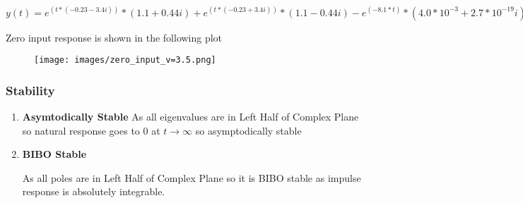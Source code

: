 \documentclass[notitlepage]{article}
\begin{document}



$y(t)=e^{(t*(- 0.23 - 3.4i))}*(1.1 + 0.44i) + e^{(t*(- 0.23 + 3.4i))}*(1.1 - 0.44i) - e^{(-8.1*t)}*(4.0*10^{-3} + 2.7*10^{-19}i) - e^{(-0.4*t)}*(1.3 - 1.6*10^{-16}i) - (5.3 + 4.7*10{-17}i)
$

\vspace{3mm}


Zero input response is shown in the following plot
\begin{figure}[!h]
    \centering
    \texttt{[image: images/zero\_input\_v=3.5.png]}
    \label{fig:my_label}
\end{figure}

\newpage
\subsubsection{Stability}
\begin{enumerate}
\item \textbf{Asymtodically Stable}
As all  eigenvalues are in Left Half of Complex Plane so natural response  goes to 0 at $t\rightarrow{\infty}$ so asymptodically stable

\item \textbf{BIBO Stable}

As all poles are in Left Half of Complex Plane so it is  BIBO stable as impulse response is absolutely integrable.

\end{enumerate}
\end{document}
